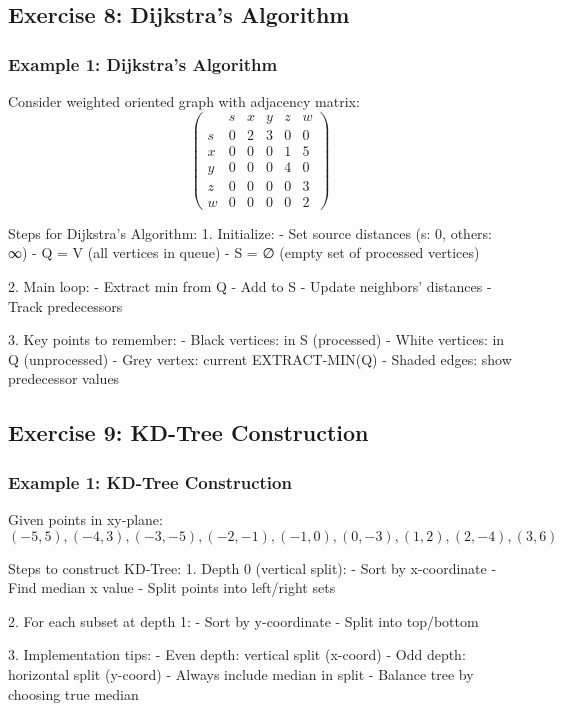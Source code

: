 \subsection{Exercise 8: Dijkstra's Algorithm}

\subsubsection{Example 1: Dijkstra's Algorithm}

Consider weighted oriented graph with adjacency matrix:
\[
\begin{pmatrix}
    & s & x & y & z & w \\
s & 0 & 2 & 3 & 0 & 0 \\
x & 0 & 0 & 0 & 1 & 5 \\
y & 0 & 0 & 0 & 4 & 0 \\
z & 0 & 0 & 0 & 0 & 3 \\
w & 0 & 0 & 0 & 0 & 2
\end{pmatrix}
\]

Steps for Dijkstra's Algorithm:
1. Initialize:
   - Set source distances (s: 0, others: ∞)
   - Q = V (all vertices in queue)
   - S = ∅ (empty set of processed vertices)

2. Main loop:
   - Extract min from Q
   - Add to S
   - Update neighbors' distances
   - Track predecessors

3. Key points to remember:
   - Black vertices: in S (processed)
   - White vertices: in Q (unprocessed)
   - Grey vertex: current EXTRACT-MIN(Q)
   - Shaded edges: show predecessor values

\subsection{Exercise 9: KD-Tree Construction}

\subsubsection{Example 1: KD-Tree Construction}

Given points in xy-plane: $(-5,5), (-4,3), (-3,-5), (-2,-1), (-1,0), (0,-3), (1,2), (2,-4), (3,6)$

Steps to construct KD-Tree:
1. Depth 0 (vertical split):
   - Sort by x-coordinate
   - Find median x value
   - Split points into left/right sets

2. For each subset at depth 1:
   - Sort by y-coordinate
   - Split into top/bottom

3. Implementation tips:
   - Even depth: vertical split (x-coord)
   - Odd depth: horizontal split (y-coord)
   - Always include median in split
   - Balance tree by choosing true median

